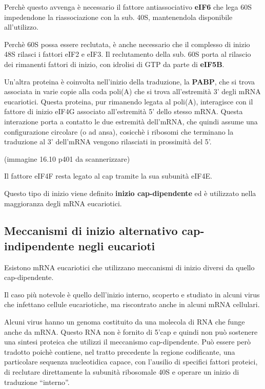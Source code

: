 \documentclass[11pt]{book}
\begin{document}
Perchè questo avvenga è necessario il fattore antiassociativo
\textbf{eIF6} che lega 60S impedendone la riassociazione con la sub.
40S, mantenendola disponibile all'utilizzo.

Perchè 60S possa essere reclutata, è anche necessario che il complesso
di inizio 48S rilasci i fattori eIF2 e eIF3. Il reclutamento della sub.
60S porta al rilascio dei rimanenti fattori di inizio, con idrolisi di
GTP da parte di \textbf{eIF5B}.

Un'altra proteina è coinvolta nell'inizio della traduzione, la
\textbf{PABP}, che si trova associata in varie copie alla coda poli(A)
che si trova all'estremità 3' degli mRNA eucariotici. Questa proteina,
pur rimanendo legata al poli(A), interagisce con il fattore di inizio
eIF4G associato all'estremità 5' dello stesso mRNA. Questa interazione
porta a contatto le due estremità dell'mRNA, che quindi assume una
configurazione circolare (o ad ansa), cosicchè i ribosomi che terminano
la traduzione al 3' dell'mRNA vengono rilasciati in prossimità del 5'.

(immagine 16.10 p401 da scannerizzare)

Il fattore eIF4F resta legato al cap tramite la sua subunità eIF4E.

Questo tipo di inizio viene definito \textbf{inizio cap-dipendente} ed è
utilizzato nella maggioranza degli mRNA eucariotici.

\subsection{Meccanismi di inizio alternativo cap-indipendente negli
eucarioti}\label{meccanismi-di-inizio-alternativo-cap-indipendente-negli-eucarioti}

Esistono mRNA eucariotici che utilizzano meccanismi di inizio diversi da
quello cap-dipendente.

Il caso più notevole è quello dell'inizio interno, scoperto e studiato
in alcuni virus che infettano cellule eucariotiche, ma riscontrato anche
in alcuni mRNA cellulari.

Alcuni virus hanno un genoma costituito da una molecola di RNA che funge
anche da mRNA. Questo RNA non è fornito di 5'cap e quindi non può
sostenere una sintesi proteica che utilizzi il meccanismo
cap-dipendente. Può essere però tradotto poichè contiene, nel tratto
precedente la regione codificante, una particolare sequenza nucleotidica
capace, con l'ausilio di specifici fattori proteici, di reclutare
direttamente la subunità ribosomale 40S e operare un inizio di
traduzione ``interno''.
\end{document}
